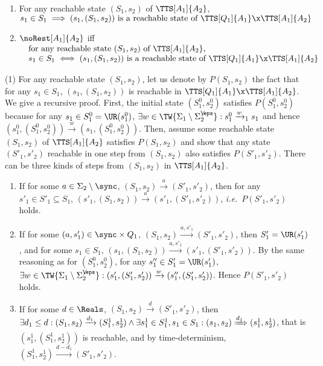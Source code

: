 \documentclass{LMCS}
\theoremstyle{plain}\newtheorem*{prop11}{Proposition~\ref{prop:states} bis}
\def\ie{{\em i.e.\ }}
\begin{document}
\begin{prop}\label{prop:reachable}\hfill
\begin{enumerate}
  \item For any reachable state $(S_1,s_2)$ of $\TTS[A_1]{A_2}$,\\
  $s_1\in S_1\implies(s_1,(S_1,s_2))\text{ is a reachable state of }
  \TTS[Q_1]{A_1}\x\TTS[A_1]{A_2}$
  \item $\noRest[A_1]{A_2}$ iff\\
  $\begin{array}{@{\quad}l}
    \text{for any reachable state }(S_1,s_2)\text{ of }\TTS[A_1]{A_2},\\
    s_1\in S_1\iff(s_1,(S_1,s_2))\text{ is a reachable state of }
    \TTS[Q_1]{A_1}\x\TTS[A_1]{A_2}
  \end{array}$
  \end{enumerate}
\end{prop}
\proof (1) For any reachable state $(S_1,s_2)$, let us denote by $P(S_1,s_2)$ the
  fact that for any $s_1\in S_1$, $(s_1,(S_1,s_2))$ is reachable in
  $\TTS[Q_1]{A_1}\x\TTS[A_1]{A_2}$. We give a recursive proof. First, the
  initial state $(S_1^0,s_2^0)$ satisfies $P(S_1^0,s_2^0)$ because for any
  $s_1\in S_1^0=\UR(s_1^0)$, $\exists w\in\TW{\Sigma_1\setminus\Sigma_{2}^{\not\eps}}:
  s_1^0\xrightarrow{w}_1 s_1$ and hence $(s_1^0,(S_1^0,s_2^0))\xrightarrow{w}
  (s_1,(S_1^0,s_2^0))$.
Then, assume some reachable state $(S_1,s_2)$ of $\TTS[A_1]{A_2}$
  satisfies $P(S_1,s_2)$ and show that any state $(S'_1,s'_2)$ reachable in
  one step from $(S_1,s_2)$ also satisfies $P(S'_1,s'_2)$.
  There can be three kinds of steps from $(S_1,s_2)$ in $\TTS[A_1]{A_2}$.
  \begin{enumerate}
  \item If for some $a\in \Sigma_2\setminus\sync$,
    $(S_1,s_2)\xrightarrow{a}(S'_1,s'_2)$, then for any
    \mbox{$s'_1\in S'_1\subseteq S_1$},
    $(s'_1,(S_1,s_2))\xrightarrow{a}(s'_1,(S'_1,s'_2))$,
    \ie $P(S'_1,s'_2)$ holds.
  \item If for some $(a,s'_1)\in \sync\times Q_1$,
    $(S_1,s_2)\xrightarrow{a,s'_1}(S'_1,s'_2)$, then $S'_1=\UR(s'_1)$, and
    for some \mbox{$s_1\in S_1$},
    $(s_1,(S_1,s_2))\xrightarrow{a,s'_1}(s'_1,(S'_1,s'_2))$.
    By the same reasoning as for $(S_1^0,s_2^0)$, for any
    $s_1''\in S'_1=\UR(s'_1)$, $\exists w\in\TW{\Sigma_1\setminus\Sigma_{2}^{\not\eps}}:
    (s'_1,(S'_1,s'_2))\xrightarrow{w}(s''_1,(S'_1,s'_2))$.
    Hence $P(S'_1,s'_2)$ holds.
  \item If for some $d\in \Reals$,
    $(S_1,s_2)\xrightarrow{d}(S'_1,s'_2)$, then
    $\exists d_1\leq d: (S_1,s_2)\xrightarrow{d_1}(S_1^1,s_2^1)\land
    \exists s_1^1\in S_1^1,s_1\in S_1:
    (s_1,s_2)\xRightarrow{d_1}(s_1^1,s_2^1)$,
    that is $(s_1^1,(S_1^1,s_2^1))$ is reachable, and by time-determinism,
    $(S_1^1,s_2^1)\xrightarrow{d-d_1}(S'_1,s'_2)$.
  \end{enumerate}
\end{document}
